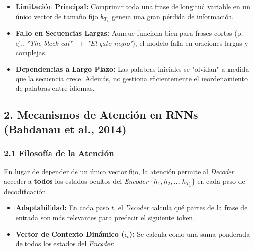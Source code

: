 \documentclass[11pt,oneside]{article}
\begin{document}
\begin{itemize}

\item \textbf{Limitación Principal:} Comprimir toda una frase de longitud variable en un único vector de tamaño fijo \(h_{T_x}\) genera una gran pérdida de información.

\end{itemize}

\begin{itemize}

\item \textbf{Fallo en Secuencias Largas:} Aunque funciona bien para frases cortas (p. ej., \emph{"The black cat"} \(\rightarrow\) \emph{"El gato negro"}), el modelo falla en oraciones largas y complejas.

\end{itemize}

\begin{itemize}

\item \textbf{Dependencias a Largo Plazo:} Las palabras iniciales se "olvidan" a medida que la secuencia crece. Además, no gestiona eficientemente el reordenamiento de palabras entre idiomas.

\end{itemize}

\subsection{2. Mecanismos de Atención en RNNs (Bahdanau et al., 2014)}

\subsubsection{2.1 Filosofía de la Atención}

En lugar de depender de un único vector fijo, la atención permite al \emph{Decoder} acceder a \textbf{todos} los estados ocultos del \emph{Encoder} \(\{h_1, h_2, \dots, h_{T_x}\}\) en cada paso de decodificación.

\begin{itemize}

\item \textbf{Adaptabilidad:} En cada paso \(t\), el \emph{Decoder} calcula qué partes de la frase de entrada son más relevantes para predecir el siguiente token.

\end{itemize}

\begin{itemize}

\item \textbf{Vector de Contexto Dinámico (\(c_t\)):} Se calcula como una suma ponderada de todos los estados del \emph{Encoder}:

\end{itemize}
\end{document}
